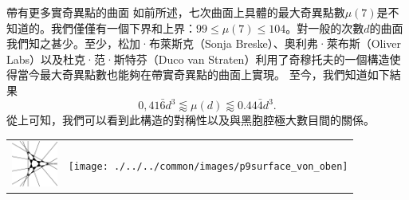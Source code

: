 \begin{surferPage}[216奇異點]{帶有更多實奇異點的曲面}
如前所述，七次曲面上具體的最大奇異點數$\mu(7)$是不知道的。我們僅僅有一個下界和上界：$99\le \mu(7) \le 104$。對一般的次數$d$的曲面我們知之甚少。至少，松加·布萊斯克（Sonja Breske）、奧利弗·萊布斯（Oliver Labs）以及杜克·范·斯特芬（Duco van Straten）利用了奇穆托夫的一個構造使得當今最大奇異點數也能夠在帶實奇異點的曲面上實現。
至今，我們知道如下結果\[0,41\bar{6}d^3 \lessapprox \mu(d) \lessapprox 0.44\bar{4} d^3.\]
從上可知，我們可以看到此構造的對稱性以及與黑胞腔極大數目間的關係。
 \begin{center}
      \begin{tabular}{c@{\qquad}c}
        \includegraphics[height=1.5cm]{./../../common/images/vielesing.pdf}
        &
        \texttt{[image: ./../../common/images/p9surface\_von\_oben]}
      \end{tabular}
    \end{center}
\end{surferPage}
